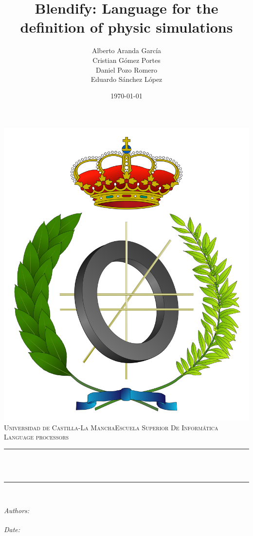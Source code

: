 \documentclass[12pt]{article}
\title{Blendify: Language for the definition of physic simulations}												    %
\author{Alberto Aranda García \\ Cristian Gómez Portes \\ Daniel Pozo Romero \\ Eduardo Sánchez López}				%
\date{\today}																										%
\makeatletter
\let\thetitle\@title
\let\theauthor\@author
\let\thedate\@date
\makeatother
\begin{document}

\begin{titlepage}
	\centering
    \vspace*{0.5 cm}
    \includegraphics[scale = 0.15]{informatica.png}\\[1.0 cm]														%
    \textsc{\LARGE Universidad de Castilla-La Mancha\newline\newline Escuela Superior De Informática}\\[2.0 cm]		%
	\textsc{\Large Language processors}\\[0.5 cm]																	%
	\rule{\linewidth}{0.2 mm} \\[0.4 cm]
	{ \huge \bfseries \thetitle}\\
	\rule{\linewidth}{0.2 mm} \\[1.5 cm]
	
	\begin{minipage}{0.4\textwidth}
		\begin{center} \large
			\emph{Authors:}\\
			\theauthor\\
			\vspace*{1 cm}
			\emph{Date:}\\
			\thedate\\
			\end{center}
        
	\end{minipage}\\[2 cm]
	
\end{titlepage}
\end{document}
